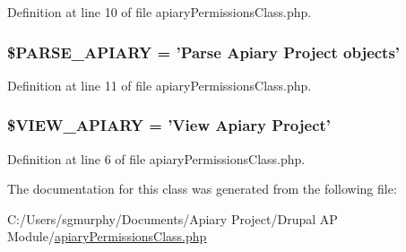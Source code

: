 Definition at line 10 of file apiaryPermissionsClass.php.

\hypertarget{classapiary_permissions_class_afb033d7a5a307633fb699003fcdf41ea}{
\subsubsection[{\$PARSE\_\-APIARY}]{\setlength{\rightskip}{0pt plus 5cm}\$PARSE\_\-APIARY = 'Parse Apiary Project objects'}}
\label{classapiary_permissions_class_afb033d7a5a307633fb699003fcdf41ea}


Definition at line 11 of file apiaryPermissionsClass.php.

\hypertarget{classapiary_permissions_class_a37d9d8b791e84a572596899b5bd45e6b}{
\subsubsection[{\$VIEW\_\-APIARY}]{\setlength{\rightskip}{0pt plus 5cm}\$VIEW\_\-APIARY = 'View Apiary Project'}}
\label{classapiary_permissions_class_a37d9d8b791e84a572596899b5bd45e6b}


Definition at line 6 of file apiaryPermissionsClass.php.



The documentation for this class was generated from the following file:\begin{DoxyCompactItemize}
\item 
C:/Users/sgmurphy/Documents/Apiary Project/Drupal AP Module/\hyperlink{apiary_permissions_class_8php}{apiaryPermissionsClass.php}\end{DoxyCompactItemize}
